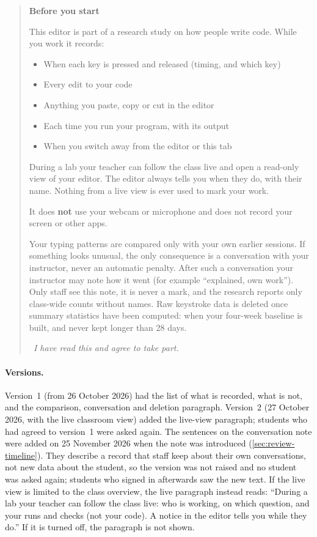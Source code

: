 \begin{quote}\small
\textbf{Before you start}

This editor is part of a research study on how people write code. While you
work it records:
\begin{itemize}[nosep]
  \item When each key is pressed and released (timing, and which key)
  \item Every edit to your code
  \item Anything you paste, copy or cut in the editor
  \item Each time you run your program, with its output
  \item When you switch away from the editor or this tab
\end{itemize}

During a lab your teacher can follow the class live and open a read-only view
of your editor. The editor always tells you when they do, with their name.
Nothing from a live view is ever used to mark your work.

It does \textbf{not} use your webcam or microphone and does not record your
screen or other apps.

Your typing patterns are compared only with your own earlier sessions. If
something looks unusual, the only consequence is a conversation with your
instructor, never an automatic penalty. After such a conversation your
instructor may note how it went (for example ``explained, own work''). Only
staff see this note, it is never a mark, and the research reports only
class-wide counts without names. Raw keystroke data is deleted once summary
statistics have been computed: when your four-week baseline is built, and never
kept longer than 28 days.

\emph{\textsquare\ I have read this and agree to take part.} \quad [Start]
\end{quote}

\paragraph{Versions.} Version~1 (from 26 October 2026) had the list of what is
recorded, what is not, and the comparison, conversation and deletion
paragraph. Version~2 (27 October 2026, with the live classroom view) added
the live-view paragraph; students who had agreed to version~1 were asked again.
The sentences on the conversation note were added on 25 November 2026 when the
note was introduced (\cref{sec:review-timeline}). They describe a record that
staff keep about their own conversations, not new data about the student, so
the version was not raised and no student was asked again; students who signed
in afterwards saw the new text. If the live view is limited to the class
overview, the live paragraph instead reads: ``During a lab your teacher can
follow the class live: who is working, on which question, and your runs and
checks (not your code). A notice in the editor tells you while they do.'' If it
is turned off, the paragraph is not shown.

